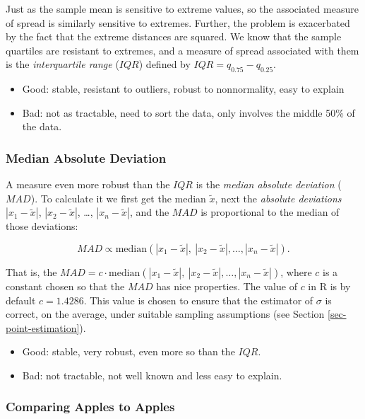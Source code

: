 \documentclass[]{book}
\providecommand{\tightlist}{%
  \setlength{\itemsep}{0pt}\setlength{\parskip}{0pt}}
\numberwithin{equation}{chapter}
\numberwithin{figure}{chapter}
\theoremstyle{plain}
\theoremstyle{definition}
\theoremstyle{remark}
\theoremstyle{definition}
\theoremstyle{definition}
\theoremstyle{remark}
\begin{document}
Just as the sample mean is sensitive to extreme values, so the
associated measure of spread is similarly sensitive to extremes.
Further, the problem is exacerbated by the fact that the extreme
distances are squared. We know that the sample quartiles are resistant
to extremes, and a measure of spread associated with them is the
\emph{interquartile range} (\(IQR\)) defined by
\(IQR=q_{0.75}-q_{0.25}\).

\begin{itemize}
\tightlist
\item
  Good: stable, resistant to outliers, robust to nonnormality, easy to
  explain
\item
  Bad: not as tractable, need to sort the data, only involves the middle
  50\% of the data.
\end{itemize}

\subsubsection{Median Absolute
Deviation}\label{median-absolute-deviation}

A measure even more robust than the \(IQR\) is the \emph{median absolute
deviation} (\(MAD\)). To calculate it we first get the median
\(\widetilde{x}\), next the \emph{absolute deviations}
\(|x_{1}-\tilde{x}|\), \(|x_{2}-\tilde{x}|\), \ldots{},
\(|x_{n}-\tilde{x}|\), and the \(MAD\) is proportional to the median of
those deviations:

\begin{equation}
MAD\propto\mbox{median}(|x_{1}-\tilde{x}|,\ |x_{2}-\tilde{x}|,\ldots,|x_{n}-\tilde{x}|).
\end{equation}

That is, the
\(MAD=c\cdot\mbox{median}(|x_{1}-\tilde{x}|,\ |x_{2}-\tilde{x}|,\ldots,|x_{n}-\tilde{x}|)\),
where \(c\) is a constant chosen so that the \(MAD\) has nice
properties. The value of \(c\) in R is by default \(c=1.4286\). This
value is chosen to ensure that the estimator of \(\sigma\) is correct,
on the average, under suitable sampling assumptions (see Section
\ref{sec-point-estimation}).

\begin{itemize}
\tightlist
\item
  Good: stable, very robust, even more so than the \(IQR\).
\item
  Bad: not tractable, not well known and less easy to explain.
\end{itemize}

\subsubsection{Comparing Apples to
Apples}\label{comparing-apples-to-apples}
\end{document}
